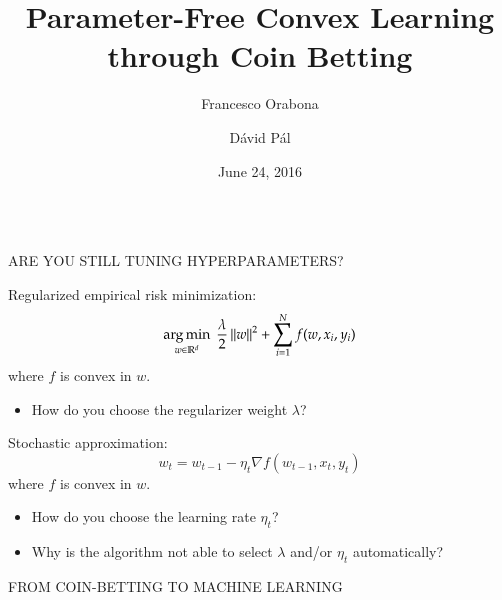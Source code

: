 \documentclass[final,t,serif,mathserif]{beamer}
\title{\huge Parameter-Free Convex Learning through Coin Betting}
\author{Francesco Orabona \and D\'avid P\'al}
\institute[] %
{
  Yahoo Research, New York
}
\date[June 24, 2016]{June 24, 2016}
\newcommand{\grad}{\nabla}
\def\blockspacea{\vspace{0.02cm}}
\begin{document}
\begin{frame}{}

\begin{columns}[t]

\begin{column}{.33\linewidth}

    \begin{block}{ARE YOU STILL TUNING HYPERPARAMETERS?}
      \blockspacea
      
      Regularized empirical risk minimization:
      \begin{equation}
      \label{equation:objective-function}
         \operatorname*{arg\,min}_{w \in \mathbb{R}^d} \ \frac{\lambda}{2} \left\|{w}\right\|^2 + \sum_{i=1}^N f(w, x_i, y_i)
      \end{equation}
      where $f$ is convex in $w$.
      \begin{itemize}
      \item How do you choose the regularizer weight $\lambda$?
      \end{itemize}
      
      \vspace{1cm}
      
      Stochastic approximation:
      \begin{equation}
      \label{equation:objective-function-sa}
         w_t = w_{t-1} - \eta_t \grad f(w_{t-1}, x_t, y_t)
      \end{equation}
      where $f$ is convex in $w$.
      \begin{itemize}
      \item How do you choose the learning rate $\eta_t$?
      \end{itemize}
      
      \vspace{1cm}
      
      \begin{itemize}      
      \item \alert{Why is the algorithm not able to select $\lambda$ and/or $\eta_t$ automatically?}
      \end{itemize}
      
      \blockspacea
    \end{block}

    \begin{block}{FROM COIN-BETTING TO MACHINE LEARNING}
    \blockspacea
    
    

\end{block}
\end{column}
\end{columns}
\end{frame}
\end{document}
